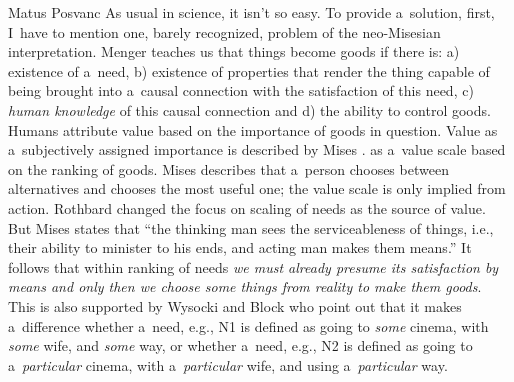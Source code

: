 \begin{artengenv}{Matus Posvanc}
As usual in science, it isn't so easy. To provide a~solution, first, I~have to mention one, barely recognized, problem of the neo-Misesian interpretation. Menger 
\parencite*[][p.52]{Menger2007Principles} %
 teaches us that things become goods if there is: a) existence of a~need, b) existence of properties that render the thing capable of being brought into a~causal connection with the satisfaction of this need, c) \textit{human knowledge} of this causal connection and d) the ability to control goods. Humans attribute value based on the importance of goods in question. Value as a~subjectively assigned importance is described by Mises .
\parencite[][p.160]{Mises2014Theory} %
 as a~value scale based on the ranking of goods. Mises 
\parencite[][pp.94–95]{Mises1998Human} %
 describes that a~person chooses between alternatives and chooses the most useful one; the value scale is only implied from action. Rothbard changed the focus on scaling of needs as the source of value. But Mises 
\parencite[][p.92]{Mises1998Human} %
 states that ``the thinking man sees the serviceableness of things, i.e., their ability to minister to his ends, and acting man makes them means.'' It follows that within ranking of needs \textit{we must already presume its satisfaction by means and only then we choose some things from reality to make them goods}. This is also supported by Wysocki and Block 
\parencite*[][]{Wysocki2019Homogeneity} %
 who point out that it makes a~difference whether a~need, e.g., N1 is defined as going to \textit{some} cinema, with \textit{some} wife, and \textit{some} way, or whether a~need, e.g., N2 is defined as going to a~\textit{particular} cinema, with a~\textit{particular} wife, and using a~\textit{particular} way.




\end{artengenv}
